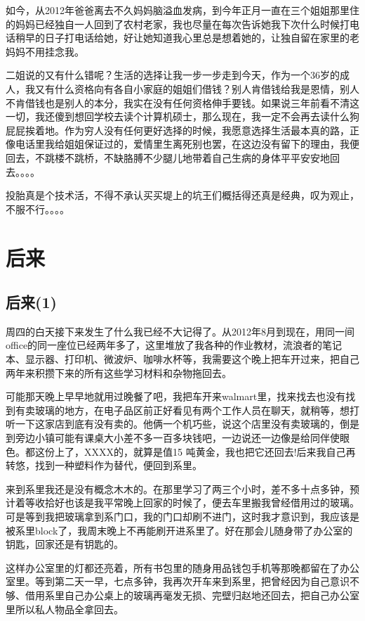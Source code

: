 \documentclass[12pt]{book}
\begin{document}
如今，从2012年爸爸离去不久妈妈脑溢血发病，到今年正月一直在三个姐姐那里住的妈妈已经独自一人回到了农村老家，我也尽量在每次告诉她我下次什么时候打电话稍早的日子打电话给她，好让她知道我心里总是想着她的，让独自留在家里的老妈妈不用挂念我。

二姐说的又有什么错呢？生活的选择让我一步一步走到今天，作为一个36岁的成人，我又有什么资格向有各自小家庭的姐姐们借钱？别人肯借钱给我是恩情，别人不肯借钱也是别人的本分，我实在没有任何资格伸手要钱。如果说三年前看不清这一切，我还傻到想回学校去读个计算机硕士，那么现在，我一定不会再去读什么狗屁屁挨着地。作为穷人没有任何更好选择的时候，我愿意选择生活最本真的路，正像电话里我给姐姐保证过的，爱情里生离死别也罢，在这边没有留下的理由，我便回去，不跳楼不跳桥，不缺胳膊不少腿儿地带着自己生病的身体平平安安地回去。。。。

投胎真是个技术活，不得不承认买买堤上的坑王们概括得还真是经典，叹为观止，不服不行。。。。
\chapter{后来}
\label{sec-34}
\section{后来(1)}
\label{sec-34-1}
周四的白天接下来发生了什么我已经不大记得了。从2012年8月到现在，用同一间office的同一座位已经两年多了，这里堆放了我各种的作业教材，流浪者的笔记本、显示器、打印机、微波炉、咖啡水杯等，我需要这个晚上把车开过来，把自己两年来积攒下来的所有这些学习材料和杂物拖回去。

可能那天晚上早早地就用过晚餐了吧，我把车开来walmart里，找来找去也没有找到有卖玻璃的地方，在电子品区前正好看见有两个工作人员在聊天，就稍等，想打听一下这家店到底有没有卖的。他俩一个机巧些，说这个店里没有卖玻璃的，倒是到旁边小镇可能有课桌大小差不多一百多块钱吧，一边说还一边像是给同伴使眼色。都这份上了，XXXX的，就算是值15 吨黄金，我也把它还回去!后来我自己再转悠，找到一种塑料作为替代，便回到系里。

来到系里我还是没有概念木木的。在那里学习了两三个小时，差不多十点多钟，预计着等收拾好也该是我平常晚上回家的时候了，便去车里搬我曾经借用过的玻璃。可是等到我把玻璃拿到系门口，我的门口却刷不进门，这时我才意识到，我应该是被系里block了，我周末晚上不再能刷开进系里了。好在那会儿随身带了办公室的钥匙，回家还是有钥匙的。

这样办公室里的灯都还亮着，所有书包里的随身用品钱包手机等那晚都留在了办公室里。等到第二天一早，七点多钟，我再次开车来到系里，把曾经因为自己意识不够、借用系里自己办公桌上的玻璃再毫发无损、完壁归赵地还回去，把自己办公室里所以私人物品全拿回去。
\end{document}
